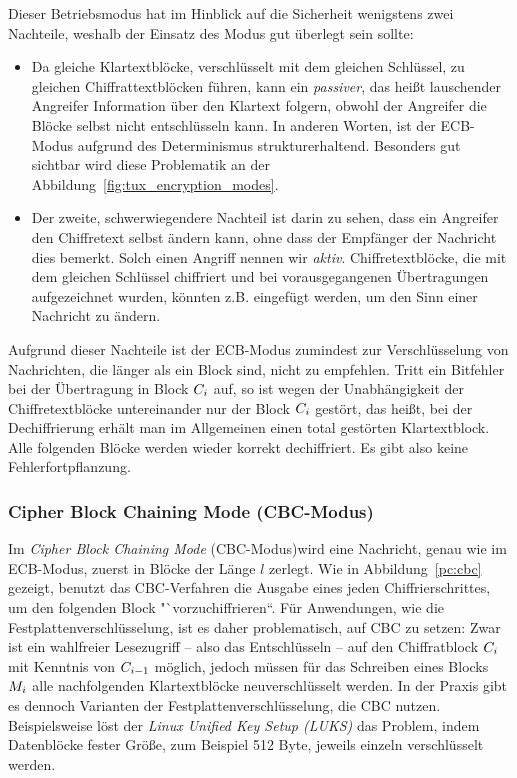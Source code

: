 Dieser Betriebsmodus hat im Hinblick auf die Sicherheit wenigstens zwei
Nachteile, weshalb der Einsatz des Modus gut überlegt sein sollte:
\begin{itemize}
\item Da gleiche Klartextblöcke, verschlüsselt mit dem gleichen
  Schlüssel, zu gleichen Chiffrattextblöcken führen, kann ein
  \emph{passiver}\indexPassiveAdv, das heißt lauschender Angreifer
  Information über den Klartext folgern, obwohl der Angreifer die Blöcke
  selbst nicht entschlüsseln kann. In anderen Worten, ist der ECB-Modus
  aufgrund des Determinismus strukturerhaltend. Besonders gut sichtbar
  wird diese Problematik an der Abbildung~\ref{fig:tux_encryption_modes}.
\item Der zweite, schwerwiegendere Nachteil ist darin zu sehen, dass ein
  Angreifer den Chiffretext selbst ändern kann, ohne dass der Empfänger
  der Nachricht dies bemerkt. Solch einen Angriff nennen wir
  \emph{aktiv}\indexActiveAdv. Chiffretextblöcke, die mit dem gleichen
  Schlüssel chiffriert und bei vorausgegangenen Übertragungen
  aufgezeichnet wurden, könnten z.B. eingefügt werden, um den Sinn einer
  Nachricht zu ändern.
\end{itemize}

Aufgrund dieser Nachteile ist der ECB-Modus zumindest zur
Verschlüsselung von Nachrichten, die länger als ein Block sind, nicht zu
empfehlen.  Tritt ein Bitfehler bei der Übertragung in Block
$C_i$ auf, so ist wegen der Unabhängigkeit der Chiffretextblöcke
untereinander nur der Block $C_i$ gestört, das heißt, bei der
Dechiffrierung erhält man im Allgemeinen einen total gestörten
Klartextblock. Alle folgenden Blöcke werden wieder korrekt
dechiffriert. Es gibt also keine Fehlerfortpflanzung.

\subsubsection{Cipher Block Chaining Mode (CBC-Modus)}\label{ssec:cbc}
Im \emph{Cipher Block Chaining Mode} (CBC-Modus)\indexCBC wird eine
Nachricht, genau wie im ECB-Modus, zuerst in Blöcke der Länge $l$
zerlegt. Wie in Abbildung~\ref{pc:cbc} gezeigt, benutzt das
CBC-Verfahren die Ausgabe eines jeden Chiffrierschrittes, um den
folgenden Block "`vorzuchiffrieren``.  Für Anwendungen, wie die
Festplattenverschlüsselung, ist es daher problematisch, auf CBC zu
setzen: Zwar ist ein wahlfreier Lesezugriff -- also das Entschlüsseln --
auf den Chiffratblock $C_i$ mit Kenntnis von $C_{i-1}$
möglich, jedoch müssen für das Schreiben eines Blocks $M_i$ alle
nachfolgenden Klartextblöcke neuverschlüsselt werden. In der Praxis gibt
es dennoch Varianten der Festplattenverschlüsselung, die CBC nutzen.
Beispielsweise löst der \emph{Linux Unified Key Setup (LUKS)} das
Problem, indem Datenblöcke fester Größe, zum Beispiel 512 Byte, jeweils
einzeln verschlüsselt werden.

